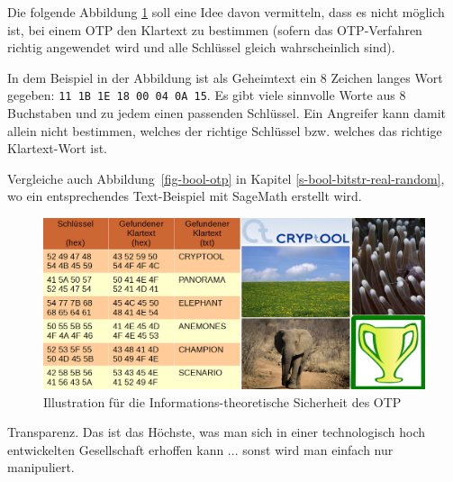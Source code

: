 \begin{refsegment}
\begin{itemize}
\end{itemize}


Die folgende Abbildung \ref{cm_Figure_OTP-demo-pictures} soll eine Idee davon vermitteln, dass es nicht möglich ist, bei einem OTP den Klartext zu bestimmen (sofern das OTP-Verfahren richtig angewendet wird und alle Schlüssel gleich wahrscheinlich sind).

In dem Beispiel in der Abbildung ist als Geheimtext ein 8 Zeichen langes Wort gegeben:
\texttt{11 1B 1E 18 00 04 0A 15}.
Es gibt viele sinnvolle Worte aus 8 Buchstaben und zu jedem einen passenden Schlüssel.
Ein Angreifer kann damit allein nicht bestimmen, welches der richtige Schlüssel bzw.
welches das richtige Klartext-Wort ist.

Vergleiche auch Abbildung~\ref{fig-bool-otp} in Kapitel \ref{s-bool-bitstr-real-random},
wo ein entsprechendes Text-Beispiel mit SageMath erstellt wird.
\begin{figure}[ht]
\begin{center}
\includegraphics[scale=0.54]{figures/OTP-demo-pictures-de.png}
\caption[Illustration für die Informations-theoretische Sicherheit des OTP]
        {Illustration für die Informations-theoretische Sicherheit des OTP\footnotemark}
\label{cm_Figure_OTP-demo-pictures}
\end{center}
\end{figure}






\begin{ctsquote}
\glqq Transparenz. Das ist das Höchste, was man sich in einer technologisch hoch entwickelten Gesellschaft erhoffen kann ... sonst wird man einfach nur manipuliert.\grqq
\caption[Daniel Suarez]{Daniel Suarez\footnotemark}
\end{ctsquote}
\addtocounter{footnote}{0}


\end{refsegment}
